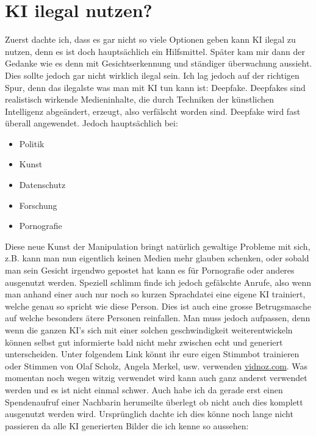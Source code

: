 \section{KI ilegal nutzen?}
Zuerst dachte ich, dass es gar nicht so viele Optionen geben kann KI ilegal zu nutzen, denn es ist doch hauptsächlich ein Hilfsmittel.
Später kam mir dann der Gedanke wie es denn mit Gesichtserkennung und ständiger überwachung aussieht. Dies sollte jedoch gar nicht wirklich ilegal sein. 
Ich lag jedoch auf der richtigen Spur, denn das ilegalste was man mit KI tun kann ist: Deepfake.
Deepfakes sind realistisch wirkende Medieninhalte, die durch Techniken der künstlichen Intelligenz abgeändert, erzeugt, also verfälscht worden sind.\citep{deepfake-wikipedia}
Deepfake wird fast überall angewendet. Jedoch hauptsächlich bei:
\begin{itemize}
    \item Politik
    \item Kunst
    \item Datenschutz
    \item Forschung
    \item Pornografie
\end{itemize}
Diese neue Kunst der Manipulation bringt natürlich gewaltige Probleme mit sich, z.B. kann man nun eigentlich keinen Medien mehr glauben schenken, oder sobald man sein Gesicht irgendwo gepostet hat kann es für Pornografie oder anderes ausgenutzt werden.
Speziell schlimm finde ich jedoch gefälschte Anrufe, also wenn man anhand einer auch nur noch so kurzen Sprachdatei eine eigene KI trainiert, welche genau so spricht wie diese Person. Dies ist auch eine grosse Betrugsmasche auf welche besonders ätere Personen reinfallen. Man muss jedoch aufpassen, denn wenn die ganzen KI's sich mit einer solchen geschwindigkeit weiterentwickeln können selbst gut informierte bald nicht mehr zwischen echt und generiert unterscheiden.
Unter folgendem Link könnt ihr eure eigen Stimmbot trainieren oder Stimmen von Olaf Scholz, Angela Merkel, usw. verwenden \href{https://de.vidnoz.com/stimme-klonen.html?insur=degooglecamp_voiceclone_stimmen%20ai%20eigene%20stimme&gad_source=1&gclid=CjwKCAjwx-CyBhAqEiwAeOcTdXzrCxZKDQlEb6uY7WpuKmMl4A4Kjq1nL8A8dgPwKI11yVB6GCWjixoCfvIQAvD_BwE}{vidnoz.com}.
Was momentan noch wegen witzig verwendet wird kann auch ganz anderst verwendet werden und es ist nicht einmal schwer.
Auch habe ich da gerade erst einen Spendenaufruf einer Nachbarin herumeilte überlegt ob nicht auch dies komplett ausgenutzt werden wird.
Ursprünglich dachte ich dies könne noch lange nicht passieren da alle KI generierten Bilder die ich kenne so aussehen:
